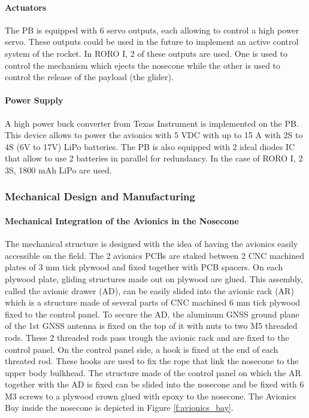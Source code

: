 \paragraph{Actuators}
 \hfill \break
The PB is equipped with 6 servo outputs, each allowing to control a high power servo. These outputs could be used in the future to implement an active control system of the rocket. In RORO I, 2 of these outputs are used. One is used to control the mechanism which ejects the nosecone while the other is used to control the release of the payload (the glider). 

\paragraph{Power Supply}
 \hfill \break
A high power buck converter from Texas Instrument is implemented on the PB. This device allows to power the avionics with 5 VDC with up to 15 A with 2S to 4S (6V to 17V) LiPo batteries. The PB is also equipped with 2 ideal diodes IC that allow to use 2 batteries in parallel for redundancy. In the case of RORO I, 2 3S, 1800 mAh LiPo are used. 


\subsubsection{Mechanical Design and Manufacturing}
\paragraph{Mechanical Integration of the Avionics in the Nosecone}
 \hfill \break
The mechanical structure is designed with the idea of having the avionics easily accessible on the field. The 2 avionics PCBs are staked between 2 CNC machined plates of 3 mm tick plywood and fixed together with PCB spacers. On each plywood plate, gliding structures made out on plywood are glued. This assembly, called the avionic drawer (AD), can be easily slided into the avionic rack (AR) which is a structure made of several parts of CNC machined 6 mm tick plywood fixed to the control panel. To secure the AD, the aluminum GNSS ground plane of the 1st GNSS antenna is fixed on the top of it with nuts to two M5 threaded rods. These 2 threaded rods pass trough the avionic rack and are fixed to the control panel. On the control panel side, a hook is fixed at the end of each threated rod. These hooks are used to fix the rope that link the nosecone to the upper body bulkhead. The structure made of the control panel on which the AR together with the AD is fixed can be slided into the nosecone and be fixed with 6 M3 screws to a plywood crown glued with epoxy to the nosecone. The Avionics Bay inside the nosecone is depicted in Figure \ref{f:avionics_bay}.

